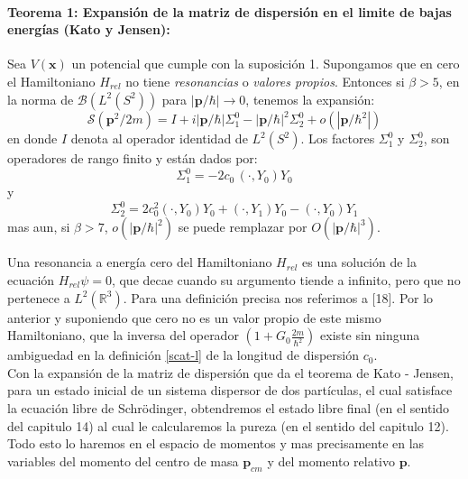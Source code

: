 \documentclass[12pt]{book}
\numberwithin{equation}{chapter}
\def\R{\mathbb{R}}
\def\S{\mathcal{S}}
\def\B{\mathcal{B}}
\def\rar{\rightarrow}
\def\x{\mathbf{x}}
\def\P{\mathbf{p}}
\begin{document}
\paragraph{Teorema 1: Expansi\'on de la matriz de dispersi\'on en el limite de bajas energ\'ias (Kato y Jensen):} Sea $V(\x)$ un potencial que cumple con la suposici\'on 1. Supongamos que en cero el Hamiltoniano $H_{rel}$ no tiene \emph{resonancias} o \emph{valores propios}. Entonces si $\beta >5$, en la norma de $\B(L^{2}(S^{2}))$ para $|\P/\hbar| \rar 0$, tenemos la expansi\'on: 
\begin{equation}\label{KJ-ex}
\S(\P^{2}/2 m)= I + i|\P/\hbar| \Sigma_{1}^{0} - |\P/\hbar|^{2} \Sigma_{2}^{0} + o(|\P/\hbar^{2}|)
\end{equation}
en donde $I$ denota al operador identidad de $L^{2}(S^{2})$. Los factores $\Sigma_{1}^{0}$ y $ \Sigma_{2}^{0} $, son operadores de rango finito y est\'an dados por:
\begin{equation}
\Sigma_{1}^{0}= -2c_{0} \, ( \cdot , Y_{0} ) Y_{0}
\end{equation}
y 
\begin{equation}
\Sigma_{2}^{0}= 2c_{0}^{2} (\cdot , Y_{0}) Y_{0} + ( \cdot,Y_{1})Y_{0} - ( \cdot,Y_{0}) Y_{1}
\end{equation}
mas aun, si $\beta >7$, $o(|\P/\hbar|^{2})$ se puede remplazar por $O(|\P/\hbar|^{3})$.\\
\rightline{$\dag$}
\vspace{3 mm}

Una resonancia a energ\'ia cero del Hamiltoniano $H_{rel}$ es una soluci\'on de la ecuaci\'on $H_{rel} \psi=0$, que decae cuando su argumento tiende a infinito, pero que no pertenece a $L^{2}(\R^{3})$. Para una definici\'on precisa nos referimos a [18]. Por lo anterior y suponiendo que cero no es un valor propio de este mismo Hamiltoniano, que la inversa del operador $\left( 1+G_{0}\frac{2m}{\hbar^{2}} \right)$ existe sin ninguna ambiguedad en la definici\'on \eqref{scat-l} de la longitud de dispersi\'on $c_{0}$.\\

Con la expansi\'on de la matriz de dispersi\'on que da el teorema de Kato - Jensen, para un estado inicial de un sistema dispersor de dos part\'iculas, el cual satisface la ecuaci\'on libre de Schr\"odinger, obtendremos el estado libre final (en el sentido del capitulo 14) al cual le calcularemos la pureza (en el sentido del capitulo 12). Todo esto lo haremos en el espacio de momentos y mas precisamente en las variables del momento del centro de masa $\P_{cm}$ y del momento relativo $\P$.\\
\end{document}
